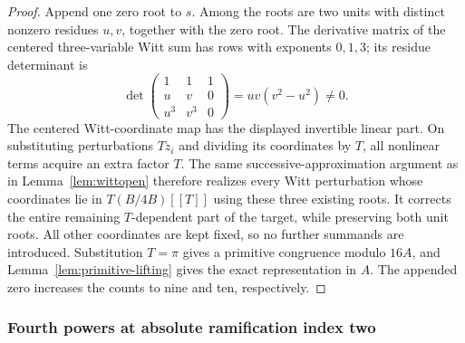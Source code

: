 \documentclass[11pt]{amsart}
\theoremstyle{definition}
\numberwithin{equation}{section}
\begin{document}
\begin{proof}
Append one zero root to $s$. Among the roots are two units with distinct
nonzero residues $u,v$, together with the zero root. The derivative
matrix of the centered three-variable Witt sum has rows with exponents
$0,1,3$; its residue determinant is
\[
 \det\begin{pmatrix}1&1&1\\u&v&0\\u^3&v^3&0\end{pmatrix}
       =uv(v^2-u^2)\ne0.
\]
The centered Witt-coordinate map has the displayed invertible
linear part.  On substituting perturbations $Tz_i$ and dividing its
coordinates by $T$, all nonlinear terms acquire an extra factor $T$.
The same successive-approximation argument as in Lemma~\ref{lem:wittopen}
therefore realizes every Witt perturbation whose coordinates lie in
$T(B/4B)[[T]]$ using these three existing roots. It corrects the entire remaining
$T$-dependent part of the target, while preserving both unit roots.
All other coordinates are kept fixed, so no further summands are
introduced. Substitution $T=\pi$ gives a primitive congruence modulo
$16A$, and Lemma~\ref{lem:primitive-lifting} gives the exact representation in $A$.
The appended zero increases the counts to nine and ten, respectively.
\end{proof}


\subsubsection{Fourth powers at absolute ramification index two}
\label{sec:quartic-ramification-two}
\end{document}
